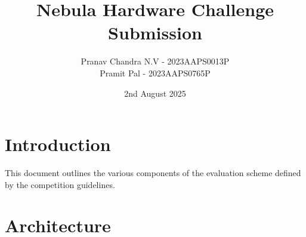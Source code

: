 \documentclass{article}
\author{Pranav Chandra N.V - 2023AAPS0013P \\ Pramit Pal - 2023AAPS0765P}
\date{2nd August 2025}
\title{Nebula Hardware Challenge Submission}
\begin{document}
	\maketitle
	\tableofcontents
	
	\newpage

	\section{Introduction}
	This document outlines the various components of the evaluation scheme defined by the competition 	guidelines.

	\section{Architecture}
\end{document}
